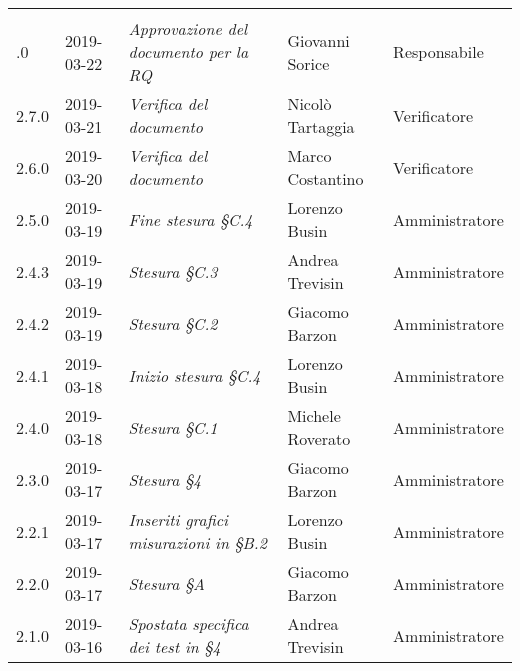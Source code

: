 \newpage 
\section*{}
	\begin{longtable}{C{2cm}|C{2.5cm}|C{4.5cm}|C{2.5cm}|C{3cm}}

	 &  &  &  &   \\
	.0 & 2019-03-22 & \emph{Approvazione del documento per la RQ} & Giovanni Sorice & Responsabile \\
		\hline
		
		2.7.0 & 2019-03-21 & \emph{Verifica del documento} & Nicolò Tartaggia & Verificatore \\
		\hline
		
		2.6.0 & 2019-03-20 & \emph{Verifica del documento} & Marco Costantino & Verificatore \\
		\hline
		
		2.5.0 & 2019-03-19 & \emph{Fine stesura §C.4} & Lorenzo Busin & Amministratore \\
		\hline
		
		2.4.3 & 2019-03-19 & \emph{Stesura §C.3} & Andrea Trevisin & Amministratore \\
		\hline
		
		2.4.2 & 2019-03-19 & \emph{Stesura §C.2} & Giacomo Barzon & Amministratore \\
		\hline
		
		2.4.1 & 2019-03-18 & \emph{Inizio stesura §C.4} & Lorenzo Busin & Amministratore \\
		\hline
		
		2.4.0 & 2019-03-18 & \emph{Stesura §C.1} & Michele Roverato & Amministratore \\
		\hline
		
		2.3.0 & 2019-03-17 & \emph{Stesura §4} & Giacomo Barzon & Amministratore \\
		\hline
	
		2.2.1 & 2019-03-17 & \emph{Inseriti grafici misurazioni in §B.2} & Lorenzo Busin & Amministratore \\
		\hline
		
		2.2.0 & 2019-03-17 & \emph{Stesura §A} & Giacomo Barzon & Amministratore \\
		\hline
	
		2.1.0 & 2019-03-16 & \emph{Spostata specifica dei test in §4} & Andrea Trevisin  & Amministratore \\
		\hline
	

\end{longtable}
